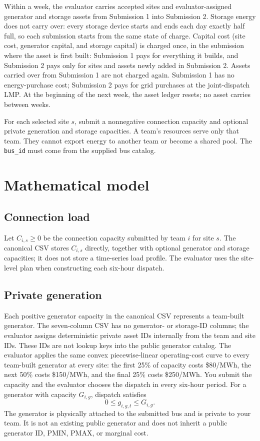 \documentclass[12pt]{article}
\newcommand{\code}[1]{\texttt{#1}}
\begin{document}
Within a week, the evaluator carries accepted sites and evaluator-assigned
generator and storage assets from Submission 1 into Submission 2. Storage
energy does not carry over: every storage device starts and ends each day
exactly half full, so each submission starts from the same state of charge.
Capital cost (site cost, generator capital, and
storage capital) is charged once, in the submission where the asset is first
built: Submission 1 pays for everything it builds, and Submission 2 pays only
for sites and assets newly added in Submission 2. Assets carried over from
Submission 1 are not charged again. Submission 1 has no energy-purchase cost;
Submission 2 pays for grid purchases at the joint-dispatch LMP. At the
beginning of the next week, the asset ledger resets; no asset carries between
weeks.

For each selected site $s$, submit a nonnegative connection capacity and
optional private generation and storage capacities. A team's resources serve
only that team. They cannot export energy to another team or become a shared
pool. The \code{bus\_id} must come from the supplied bus catalog.

\section{Mathematical model}

\subsection{Connection load}

Let $C_{i,s}\geq 0$ be the connection capacity submitted by team $i$ for site
$s$. The canonical CSV stores $C_{i,s}$ directly, together with optional
generator and storage capacities; it does not store a time-series load profile.
The evaluator uses the site-level plan when constructing each six-hour dispatch.

\subsection{Private generation}

Each positive generator capacity in the canonical CSV represents a team-built
generator. The seven-column CSV has no generator- or storage-ID columns; the
evaluator assigns deterministic private asset IDs internally from the team and
site IDs. These IDs are not lookup keys into the public generator catalog. The
evaluator applies the
same convex piecewise-linear operating-cost curve to every team-built generator
at every site: the first 25\% of capacity costs \$80/MWh, the next 50\% costs
\$150/MWh, and the final 25\% costs \$250/MWh. You submit the capacity and the
evaluator chooses the dispatch in every six-hour period. For a generator with capacity $G_{i,g}$,
dispatch satisfies
\[
  0\le g_{i,g,t}\le G_{i,g}.
\]
The generator is physically attached to the submitted bus and is private to your
team. It is not an existing public generator and does not inherit a public
generator ID, PMIN, PMAX, or marginal cost.
\end{document}
